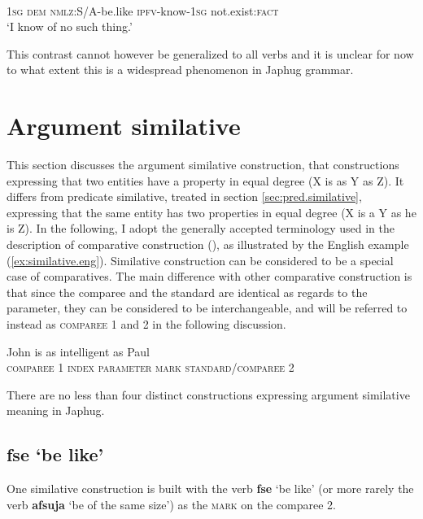 \documentclass[oneside,a4paper,11pt]{article}
\newcommand{\ipa}[1]{{\phon\textbf{#1}}} %
\newcommand{\forme}[2]{\ipa{#1} `#2'}
\begin{document}
\begin{exe}
\ex \label{ex:pjWsWza}
\gll [\ipa{aʑo} 	\ipa{nɯ} 	\ipa{kɯ-fse} 	\ipa{pjɯ-sɯz-a}]	\ipa{me} \\
\textsc{1sg} \textsc{dem} \textsc{nmlz}:S/A-be.like \textsc{ipfv}-know-\textsc{1sg} not.exist:\textsc{fact} \\
\glt `I know of no such thing.'
\end{exe}

This contrast cannot however be generalized to all verbs and it is unclear for now to what extent this is a widespread phenomenon in Japhug grammar.

\section{Argument similative} \label{sec:arg.similative}
This section discusses the argument similative construction, that constructions expressing that two entities have a property in equal degree (X is as Y as Z). It differs from predicate similative, treated in section \ref{sec:pred.similative}, expressing that the same entity has two properties in equal degree (X is a Y as he is Z). In the following, I adopt the generally accepted terminology used in the description of comparative construction (\citealt{dixon08comparative}), as illustrated by the English example (\ref{ex:similative.eng}). Similative construction can be considered to be a special case of comparatives. The main difference with other comparative construction is that since the comparee and the standard are identical as regards to the parameter, they can be considered to be interchangeable, and will be referred to instead as \textsc{comparee} 1 and 2 in the following discussion.

\begin{exe}
\ex \label{ex:similative.eng}
\gll  John is as intelligent as Paul \\
\textsc{comparee 1} { } \textsc{index} \textsc{parameter} \textsc{mark} \textsc{standard/comparee 2}  \\
\end{exe}

There are no less than four distinct constructions expressing argument similative meaning in Japhug. 

\subsection{\forme{fse}{be like}} \label{sec:fse}
One similative construction is built with the verb \forme{fse}{be like} (or more rarely the verb \forme{afsuja}{be of the same size}) as the \textsc{mark} on the comparee 2.
\end{document}
